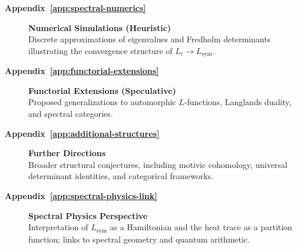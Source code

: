 \begin{description}
  \item[\textbf{Appendix~\ref{app:spectral-numerics}}] \textbf{Numerical Simulations (Heuristic)} \\
  Discrete approximations of eigenvalues and Fredholm determinants illustrating the convergence structure of \( L_t \to L_{\mathrm{sym}} \).

  \item[\textbf{Appendix~\ref{app:functorial-extensions}}] \textbf{Functorial Extensions (Speculative)} \\
  Proposed generalizations to automorphic \( L \)-functions, Langlands duality, and spectral categories.

  \item[\textbf{Appendix~\ref{app:additional-structures}}] \textbf{Further Directions} \\
  Broader structural conjectures, including motivic cohomology, universal determinant identities, and categorical frameworks.

  \item[\textbf{Appendix~\ref{app:spectral-physics-link}}] \textbf{Spectral Physics Perspective} \\
  Interpretation of \( L_{\mathrm{sym}} \) as a Hamiltonian and the heat trace as a partition function; links to spectral geometry and quantum arithmetic.
\end{description}
